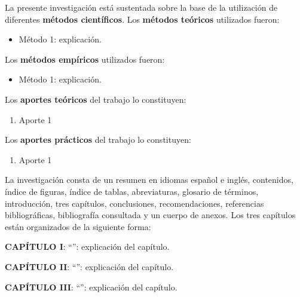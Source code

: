 La presente investigación está sustentada sobre la base de la utilización de diferentes \textbf{métodos científicos}. Los \textbf{métodos teóricos} utilizados fueron:

\begin{itemize}
	\item Método 1: explicación.
\end{itemize}

Los \textbf{métodos empíricos} utilizados fueron:
\begin{itemize}
	\item Método 1: explicación.
\end{itemize}

Los \textbf{aportes teóricos} del trabajo lo constituyen:
\begin{enumerate}
	\item Aporte 1
\end{enumerate}

Los \textbf{aportes prácticos} del trabajo lo constituyen:
\begin{enumerate}
	\item Aporte 1
\end{enumerate}

La investigación consta de un resumen en idiomas español e inglés, contenidos, índice de fi\-guras, índice de tablas, abreviaturas, glosario de términos, introducción, tres capítulos, conclusiones, recomendaciones, referencias bibliográficas, bibliografía consultada y un cuerpo de anexos. Los tres capítulos están organizados de la siguiente forma:

\textbf{CAPÍTULO I}: “\CapUno”: explicación del capítulo.

\textbf{CAPÍTULO II}: “\CapDos”: explicación del capítulo.

\textbf{CAPÍTULO III}: “\CapTres”: explicación del capítulo.